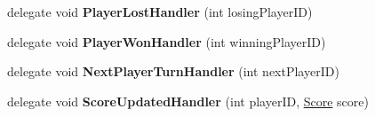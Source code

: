 \begin{DoxyCompactItemize}
\item 
delegate void {\bfseries Player\+Lost\+Handler} (int losing\+Player\+ID)\hypertarget{class_tower_v_r_1_1_tower_game_manager_a9caa83a7218ba6076cb2b486373bb8dc}{}\label{class_tower_v_r_1_1_tower_game_manager_a9caa83a7218ba6076cb2b486373bb8dc}

\item 
delegate void {\bfseries Player\+Won\+Handler} (int winning\+Player\+ID)\hypertarget{class_tower_v_r_1_1_tower_game_manager_a686d2c9d0920eade95dc5a3156da132c}{}\label{class_tower_v_r_1_1_tower_game_manager_a686d2c9d0920eade95dc5a3156da132c}

\item 
delegate void {\bfseries Next\+Player\+Turn\+Handler} (int next\+Player\+ID)\hypertarget{class_tower_v_r_1_1_tower_game_manager_a5cc6c300c296925e5e6b33a16e0553ca}{}\label{class_tower_v_r_1_1_tower_game_manager_a5cc6c300c296925e5e6b33a16e0553ca}

\item 
delegate void {\bfseries Score\+Updated\+Handler} (int player\+ID, \hyperlink{struct_tower_v_r_1_1_score}{Score} score)\hypertarget{class_tower_v_r_1_1_tower_game_manager_ab5e73141e867a0d3505f87cafe04f0f8}{}\label{class_tower_v_r_1_1_tower_game_manager_ab5e73141e867a0d3505f87cafe04f0f8}

\end{DoxyCompactItemize}
